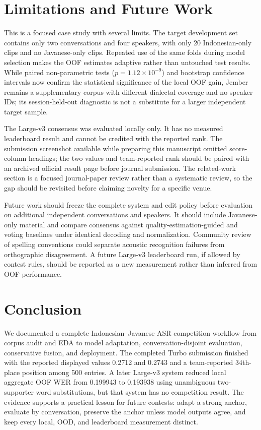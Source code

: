 \documentclass[journal]{IEEEtran}
\begin{document}
\section{Limitations and Future Work}
This is a focused case study with several limits. The target development set contains only two conversations and four speakers, with only 20 Indonesian-only clips and no Javanese-only clips. Repeated use of the same folds during model selection makes the OOF estimates adaptive rather than untouched test results. While paired non-parametric tests ($p = 1.12 \times 10^{-9}$) and bootstrap confidence intervals now confirm the statistical significance of the local OOF gain, Jember remains a supplementary corpus with different dialectal coverage and no speaker IDs; its session-held-out diagnostic is not a substitute for a larger independent target sample.

The Large-v3 consensus was evaluated locally only. It has no measured leaderboard result and cannot be credited with the reported rank. The submission screenshot available while preparing this manuscript omitted score-column headings; the two values and team-reported rank should be paired with an archived official result page before journal submission. The related-work section is a focused journal-paper review rather than a systematic review, so the gap should be revisited before claiming novelty for a specific venue.

Future work should freeze the complete system and edit policy before evaluation on additional independent conversations and speakers. It should include Javanese-only material and compare consensus against quality-estimation-guided and voting baselines under identical decoding and normalization. Community review of spelling conventions could separate acoustic recognition failures from orthographic disagreement. A future Large-v3 leaderboard run, if allowed by contest rules, should be reported as a new measurement rather than inferred from OOF performance.

\section{Conclusion}
We documented a complete Indonesian--Javanese ASR competition workflow from corpus audit and EDA to model adaptation, conversation-disjoint evaluation, conservative fusion, and deployment. The completed Turbo submission finished with the reported displayed values 0.2712 and 0.2743 and a team-reported 34th-place position among 500 entries. A later Large-v3 system reduced local aggregate OOF WER from 0.199943 to 0.193938 using unambiguous two-supporter word substitutions, but that system has no competition result. The evidence supports a practical lesson for future contests: adapt a strong anchor, evaluate by conversation, preserve the anchor unless model outputs agree, and keep every local, OOD, and leaderboard measurement distinct.
\end{document}
